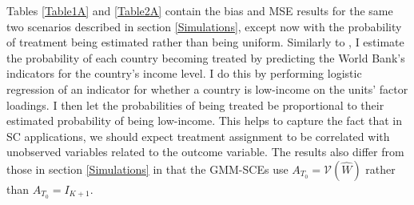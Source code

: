 \documentclass{article}
\begin{document}
\setcounter{table}{0}
\renewcommand{\thetable}{A\arabic{table}}

Tables \ref{Table1A} and \ref{Table2A} contain the bias and MSE results for the same two scenarios described in section \ref{Simulations}, except now with the probability of treatment being estimated rather than being uniform. Similarly to \cite{SDID}, I estimate the probability of each country becoming treated by predicting the World Bank's indicators for the country's income level. I do this by performing logistic regression of an indicator for whether a country is low-income on the units' factor loadings. I then let the probabilities of being treated be proportional to their estimated probability of being low-income. This helps to capture the fact that in SC applications, we should expect treatment assignment to be correlated with unobserved variables related to the outcome variable. The results also differ from those in section \ref{Simulations} in that the GMM-SCEs use $A_{T_0} = \hat{\mathcal{V}}(\hat{W})$ rather than $A_{T_0} = I_{K+1}$.
\end{document}
